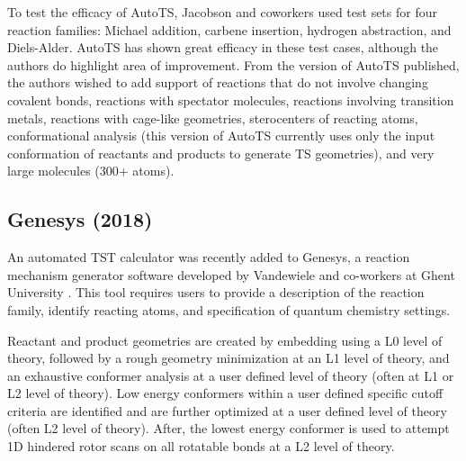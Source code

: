 \documentclass[preprint, 11pt]{elsarticle} %
\begin{document}
To test the efficacy of AutoTS, Jacobson and coworkers used test sets for four reaction families: Michael addition, carbene insertion, hydrogen abstraction, and Diels-Alder.
AutoTS has shown great efficacy in these test cases, although the authors do highlight area of improvement.
From the version of AutoTS published, the authors wished to add support of reactions that do not involve changing covalent bonds, reactions with spectator molecules, reactions involving transition metals, reactions with cage-like geometries, sterocenters of reacting atoms, conformational analysis (this version of AutoTS currently uses only the input conformation of reactants and products to generate TS geometries), and very large molecules (300+ atoms).



\subsection{Genesys (2018)}

An automated TST calculator was recently added to Genesys, a reaction mechanism generator software developed by Vandewiele and co-workers at Ghent University \cite{VANDEVIJVER:2018, vandewiele:2012}.%
This tool requires users to provide a description of the reaction family, identify reacting atoms, and specification of quantum chemistry settings.

Reactant and product geometries are created by embedding using a L0 level of theory, followed by a rough geometry minimization at an L1 level of theory, and an exhaustive conformer analysis at a user defined level of theory (often at L1 or L2 level of theory).
Low energy conformers within a user defined specific cutoff criteria are identified and are further optimized at a user defined level of theory (often L2 level of theory).
After, the lowest energy conformer is used to attempt 1D hindered rotor scans on all rotatable bonds at a L2 level of theory.
\end{document}
